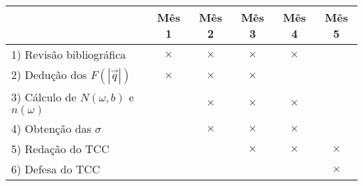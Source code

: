 \begin{tabular}{lccccc}
	\hline
	& Mês 1 & Mês 2 & Mês 3 & Mês 4 & Mês 5\\
	\hline \hline
	1) Revisão bibliográfica & $\times$ & $\times$ & $\times$ &
	$\times$ & \\
	2) Dedução dos $F(|\vec{q}|)$ & $\times$
		 & $\times$ & $\times$ & & \\
	3) Cálculo de $N(\omega, b)$ e $n(\omega)$ & & $\times$ & $\times$
	& $\times$ & \\
	4) Obtenção das $\sigma$ & & $\times$ &
	$\times$ & $\times$ & \\
	5) Redação do TCC & & & $\times$ & $\times$ & $\times$ \\
	6) Defesa do TCC & & & & & $\times$ \\
	\hline
\end{tabular}

